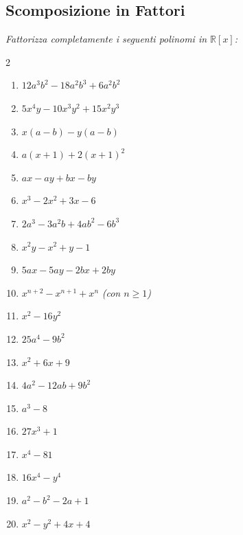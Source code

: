 \subsection{Scomposizione in Fattori}
\textit{Fattorizza completamente i seguenti polinomi in $\mathbb{R}[x]$:}
\begin{multicols}{2}
\begin{enumerate}
    \item {} $12a^3b^2 - 18a^2b^3 + 6a^2b^2$
    \item {} $5x^4y - 10x^3y^2 + 15x^2y^3$
    \item {} $x(a-b) - y(a-b)$
    \item {} $a(x+1) + 2(x+1)^2$
    \item {} $ax - ay + bx - by$
    \item {} $x^3 - 2x^2 + 3x - 6$
    \item {} $2a^3 - 3a^2b + 4ab^2 - 6b^3$
    \item {} $x^2y - x^2 + y - 1$
    \item {} $5ax - 5ay - 2bx + 2by$
    \item {} $x^{n+2} - x^{n+1} + x^n$ \textit{(con $n \ge 1$)}
    
    \item {} $x^2 - 16y^2$
    \item {} $25a^4 - 9b^2$
    \item {} $x^2 + 6x + 9$
    \item {} $4a^2 - 12ab + 9b^2$
    \item {} $a^3 - 8$
    \item {} $27x^3 + 1$
    \item {} $x^4 - 81$
    \item {} $16x^4 - y^4$
    \item {} $a^2 - b^2 - 2a + 1$
    \item {} $x^2 - y^2 + 4x + 4$
    

\end{enumerate}
\end{multicols}
